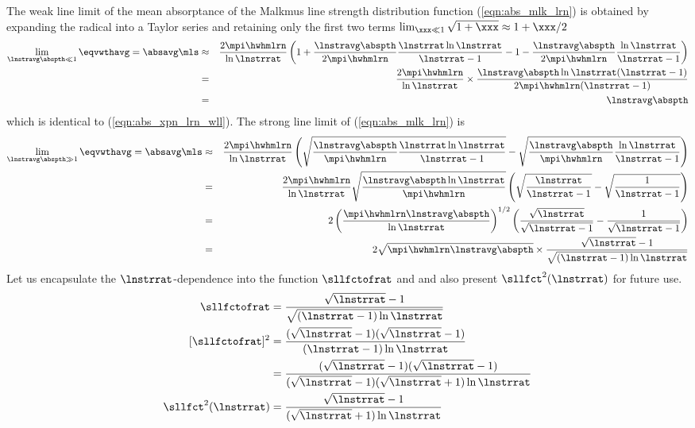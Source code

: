 \documentclass[12pt]{article}
\begin{document}
The weak line limit of the mean absorptance of the Malkmus line
strength distribution function (\ref{eqn:abs_mlk_lrn}) is obtained
by expanding the radical into a Taylor series and retaining only the
first two terms
$\lim_{\xxx \ll 1} \sqrt{1 + \xxx} \approx 1 + \xxx/2$
\begin{eqnarray}
\lim_{\lnstravg \abspth \ll 1} \eqvwthavg = \absavg \mls & \approx &
\frac{2 \mpi \hwhmlrn}{\ln \lnstrrat} 
\left( 
1 + \frac{\lnstravg \abspth}{2 \mpi \hwhmlrn} 
\frac{\lnstrrat \ln \lnstrrat}{\lnstrrat - 1} -
1 - \frac{\lnstravg \abspth}{2 \mpi \hwhmlrn}
\frac{\ln \lnstrrat}{\lnstrrat - 1}
\right) \nonumber \\
& = &
\frac{2 \mpi \hwhmlrn}{\ln \lnstrrat} 
\times
\frac{\lnstravg \abspth \ln \lnstrrat (\lnstrrat - 1)}
{2 \mpi \hwhmlrn (\lnstrrat - 1)} 
\nonumber \\
& = &
\lnstravg \abspth
\label{eqn:abs_mlk_lrn_wll}
\end{eqnarray}
which is identical to (\ref{eqn:abs_xpn_lrn_wll}).
The strong line limit of (\ref{eqn:abs_mlk_lrn}) is
\begin{eqnarray}
\lim_{\lnstravg \abspth \gg 1} \eqvwthavg = \absavg \mls & \approx &
\frac{2 \mpi \hwhmlrn}{\ln \lnstrrat} 
\left( 
\sqrt{\frac{\lnstravg \abspth}{\mpi \hwhmlrn} 
\frac{\lnstrrat \ln \lnstrrat}{\lnstrrat - 1}} -
\sqrt{\frac{\lnstravg \abspth}{\mpi \hwhmlrn}
\frac{\ln \lnstrrat}{\lnstrrat - 1}}
\right) \nonumber \\
& = & 
\frac{2 \mpi \hwhmlrn}{\ln \lnstrrat} 
\sqrt{\frac{\lnstravg \abspth \ln \lnstrrat}{\mpi \hwhmlrn}}
\left(
\sqrt{\frac{\lnstrrat}{\lnstrrat - 1}} -
\sqrt{\frac{1}{\lnstrrat - 1}} \right)
\nonumber \\
& = & 
2 \left(\frac{\mpi \hwhmlrn \lnstravg \abspth}{\ln \lnstrrat}\right)^{1/2}
\left(
\frac{\sqrt{\lnstrrat}}{\sqrt{\lnstrrat - 1}} -
\frac{1}{\sqrt{\lnstrrat - 1}} \right)
\nonumber \\
& = & 
2\sqrt{\mpi \hwhmlrn \lnstravg \abspth} \times
\frac{\sqrt{\lnstrrat} - 1}{\sqrt{(\lnstrrat - 1) \ln \lnstrrat}}
\label{eqn:abs_mlk_lrn_sll1}
\end{eqnarray}
Let us encapsulate the $\lnstrrat$-dependence into the function
$\sllfctofrat$ and and also present $\sllfct^{2}(\lnstrrat)$ for
future use.
\begin{subequations}
\label{eqn:sll_fct}
\begin{align}
\label{eqn:sll_fct_dfn}
\sllfctofrat & =  
\frac{\sqrt{\lnstrrat} - 1}{\sqrt{(\lnstrrat - 1) \ln \lnstrrat}} \\
[\sllfctofrat]^{2} 
& =  
\frac{(\sqrt{\lnstrrat} - 1)(\sqrt{\lnstrrat} - 1)}
{(\lnstrrat - 1) \ln \lnstrrat} \nonumber \\
& =  
\frac{(\sqrt{\lnstrrat} - 1)(\sqrt{\lnstrrat} - 1)}
{(\sqrt{\lnstrrat} - 1)(\sqrt{\lnstrrat} + 1) \ln \lnstrrat} \nonumber \\
\label{eqn:sll_fct_sqr_dfn}
\sllfct^{2}(\lnstrrat) 
& =  
\frac{\sqrt{\lnstrrat} - 1}{(\sqrt{\lnstrrat} + 1) \ln \lnstrrat}
\end{align}
\end{subequations}
\end{document}
